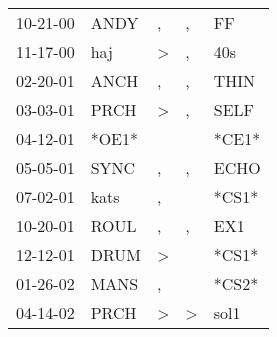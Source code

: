 \begin{supertabular}{lllll}
 10-21-00 &   ANDY &             , &             , &     FF \\
 11-17-00 &    haj &  \textgreater &             , &    40s \\
 02-20-01 &   ANCH &             , &             , &   THIN \\
 03-03-01 &   PRCH &  \textgreater &             , &   SELF \\
 04-12-01 &  *OE1* &               &               &  *CE1* \\
 05-05-01 &   SYNC &             , &             , &   ECHO \\
 07-02-01 &   kats &             , &               &  *CS1* \\
 10-20-01 &   ROUL &             , &             , &    EX1 \\
 12-12-01 &   DRUM &  \textgreater &               &  *CS1* \\
 01-26-02 &   MANS &             , &               &  *CS2* \\
 04-14-02 &   PRCH &  \textgreater &  \textgreater &   sol1 \\
\end{supertabular}
